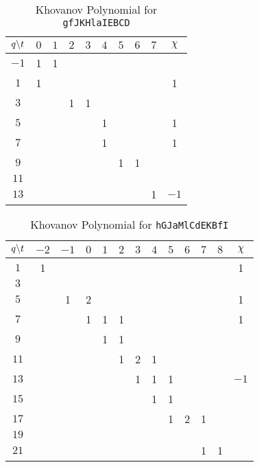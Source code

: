 \documentclass{article}
\theoremstyle{plain}
\begin{document}
        \begin{table}[H]
            \centering
            \begin{tabular}{| c | c | c | c | c | c | c | c | c | c |}
                \hline
                $q\symbol{92}t$&$0$&$1$&$2$&$3$&$4$&$5$&$6$&$7$&$\chi$\\
                \hline
                $-1$&1&1&&&&&&&\\
                \hline
                $1$&1&&&&&&&&1\\
                \hline
                $3$&&&1&1&&&&&\\
                \hline
                $5$&&&&&1&&&&1\\
                \hline
                $7$&&&&&1&&&&1\\
                \hline
                $9$&&&&&&1&1&&\\
                \hline
                $11$&&&&&&&&&\\
                \hline
                $13$&&&&&&&&1&$-1$\\
                \hline
            \end{tabular}
            \caption{Khovanov Polynomial for \texttt{gfJKHlaIEBCD}}
            \label{table:gfJKHlaIEBCD_kho}
        \end{table}
        \begin{table}[H]
            \centering
            \begin{tabular}{| c | c | c | c | c | c | c | c | c | c | c | c | c |}
                \hline
                $q\symbol{92}t$&$-2$&$-1$&$0$&$1$&$2$&$3$&$4$&$5$&$6$&$7$&$8$&$\chi$\\
                \hline
                $1$&1&&&&&&&&&&&1\\
                \hline
                $3$&&&&&&&&&&&&\\
                \hline
                $5$&&1&2&&&&&&&&&1\\
                \hline
                $7$&&&1&1&1&&&&&&&1\\
                \hline
                $9$&&&&1&1&&&&&&&\\
                \hline
                $11$&&&&&1&2&1&&&&&\\
                \hline
                $13$&&&&&&1&1&1&&&&$-1$\\
                \hline
                $15$&&&&&&&1&1&&&&\\
                \hline
                $17$&&&&&&&&1&2&1&&\\
                \hline
                $19$&&&&&&&&&&&&\\
                \hline
                $21$&&&&&&&&&&1&1&\\
                \hline
            \end{tabular}
            \caption{Khovanov Polynomial for \texttt{hGJaMlCdEKBfI}}
            \label{table:hGJaMlCdEKBfI_kho}
        \end{table}
\end{document}
